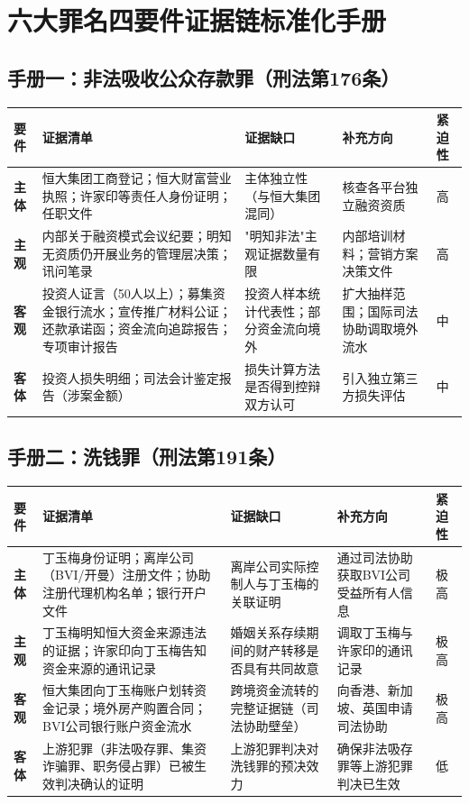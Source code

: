 \documentclass[11pt,a4paper,oneside,openany]{article}
\begin{document}
\section{六大罪名四要件证据链标准化手册}

\subsection{手册一：非法吸收公众存款罪（刑法第176条）}
\begin{threeparttable}
\caption{非法吸收公众存款罪四要件证据链}
\begin{tabular}{p{1.5cm}p{3.8cm}p{3.8cm}p{2cm}p{1.5cm}}
\toprule
\textbf{要件} & \textbf{证据清单} & \textbf{证据缺口} & \textbf{补充方向} & \textbf{紧迫性} \\
\midrule
\textbf{主体} & 恒大集团工商登记；恒大财富营业执照；许家印等责任人身份证明；任职文件 & 主体独立性（与恒大集团混同） & 核查各平台独立融资资质 & 高 \\
\textbf{主观} & 内部关于融资模式会议纪要；明知无资质仍开展业务的管理层决策；讯问笔录 & "明知非法"主观证据数量有限 & 内部培训材料；营销方案决策文件 & 高 \\
\textbf{客观} & 投资人证言（50人以上）；募集资金银行流水；宣传推广材料公证；还款承诺函；资金流向追踪报告；专项审计报告 & 投资人样本统计代表性；部分资金流向境外 & 扩大抽样范围；国际司法协助调取境外流水 & 中 \\
\textbf{客体} & 投资人损失明细；司法会计鉴定报告（涉案金额） & 损失计算方法是否得到控辩双方认可 & 引入独立第三方损失评估 & 中 \\
\bottomrule
\end{tabular}
\end{threeparttable}

\subsection{手册二：洗钱罪（刑法第191条）}
\begin{threeparttable}
\caption{洗钱罪四要件证据链（丁玉梅跨境转移案专项）}
\begin{tabular}{p{1.5cm}p{3.8cm}p{3.8cm}p{2cm}p{1.5cm}}
\toprule
\textbf{要件} & \textbf{证据清单} & \textbf{证据缺口} & \textbf{补充方向} & \textbf{紧迫性} \\
\midrule
\textbf{主体} & 丁玉梅身份证明；离岸公司（BVI/开曼）注册文件；协助注册代理机构名单；银行开户文件 & 离岸公司实际控制人与丁玉梅的关联证明 & 通过司法协助获取BVI公司受益所有人信息 & 极高 \\
\textbf{主观} & 丁玉梅明知恒大资金来源违法的证据；许家印向丁玉梅告知资金来源的通讯记录 & 婚姻关系存续期间的财产转移是否具有共同故意 & 调取丁玉梅与许家印的通讯记录 & 极高 \\
\textbf{客观} & 恒大集团向丁玉梅账户划转资金记录；境外房产购置合同；BVI公司银行账户资金流水 & 跨境资金流转的完整证据链（司法协助壁垒） & 向香港、新加坡、英国申请司法协助 & 极高 \\
\textbf{客体} & 上游犯罪（非法吸存罪、集资诈骗罪、职务侵占罪）已被生效判决确认的证明 & 上游犯罪判决对洗钱罪的预决效力 & 确保非法吸存罪等上游犯罪判决已生效 & 低 \\
\bottomrule
\end{tabular}
\end{threeparttable}
\end{document}
